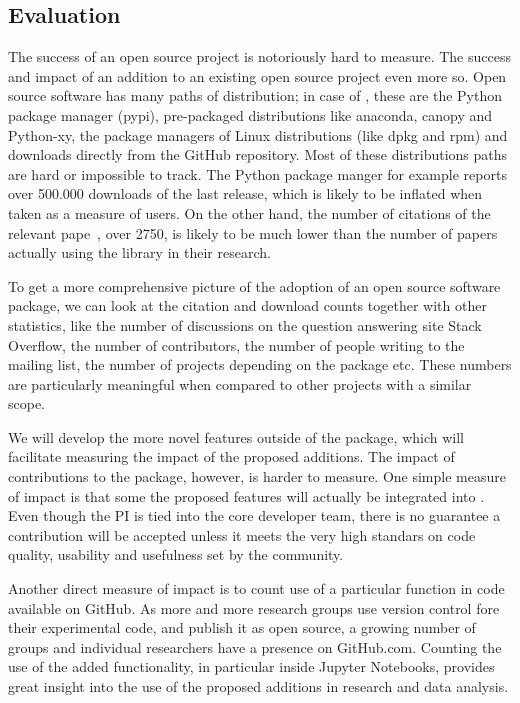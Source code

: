\subsection{Evaluation}
The success of an open source project is notoriously hard to measure. The
success and impact of an addition to an existing open source project even more
so. Open source software has many paths of distribution; in case of \sklearn{},
these are the Python package manager (pypi), pre-packaged distributions like
anaconda, canopy and Python-xy, the package managers of Linux distributions (like dpkg and rpm)
and downloads directly from the GitHub repository. Most of these distributions paths are hard
or impossible to track. The Python package manger for example reports over 500.000 downloads of the last
release, which is likely to be inflated when taken as a measure of users.
On the other hand, the number of citations of the relevant
pape~\autocite{pedregosa2011scikit}, over 2750, is likely to be much lower than
the number of papers actually using the \sklearn{} library in their research.

To get a more comprehensive picture of the adoption of an open source software
package, we can look at the citation and download counts together with other
statistics, like the number of discussions on the question answering site
Stack Overflow, the number of contributors, the number of people writing to the
mailing list, the number of projects depending on the package etc.  These
numbers are particularly meaningful when compared to other projects with a
similar scope.

We will develop the more novel features outside of the \sklearn{} package, which will
facilitate measuring the impact of the proposed additions. The impact of contributions
to the \sklearn{} package, however, is harder to measure. One simple measure of impact
is that some the proposed features will actually be integrated into \sklearn{}.
Even though the PI is tied into the core developer team, there is no guarantee
a contribution will be accepted unless it meets the very high standars
on code quality, usability and usefulness set by the community.

Another direct measure of impact is to count use of a particular function in
code available on GitHub. As more and more research groups use version
control fore their experimental code, and publish it as open source, a growing
number of groups and individual researchers have a presence on GitHub.com.
Counting the use of the added functionality, in particular inside Jupyter
Notebooks, provides great insight into the use of the proposed additions in
research and data analysis.


